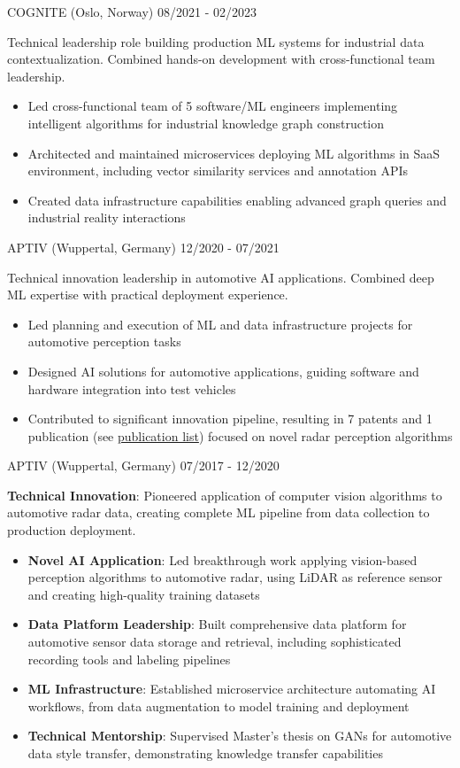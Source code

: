 \documentclass[singlesided,
               paper=a4,
               fontsize=10pt
              ]{my-resume}
\begin{document}
%
	{COGNITE (Oslo, Norway)}
	{08/2021 - 02/2023}
    {
        Technical leadership role building production ML systems for industrial data contextualization. Combined hands-on development with cross-functional team leadership.
        \begin{itemize}[leftmargin=2em]
            \item Led cross-functional team of 5 software/ML engineers implementing intelligent algorithms for industrial knowledge graph construction
            \item Architected and maintained microservices deploying ML algorithms in SaaS environment, including vector similarity services and annotation APIs
            \item Created data infrastructure capabilities enabling advanced graph queries and industrial reality interactions
        \end{itemize}
    }
%
    {APTIV (Wuppertal, Germany)}
    {12/2020 - 07/2021}
    {
        Technical innovation leadership in automotive AI applications. Combined deep ML expertise with practical deployment experience.
        \begin{itemize}[leftmargin=2em]
            \item Led planning and execution of ML and data infrastructure projects for automotive perception tasks
            \item Designed AI solutions for automotive applications, guiding software and hardware integration into test vehicles
            \item Contributed to significant innovation pipeline, resulting in 7 patents and 1 publication (see \href{https://scholar.google.com/citations?hl=de&user=MnU8ZxwAAAAJ}{publication list}) focused on novel radar perception algorithms
        \end{itemize}
    }
%
    {APTIV (Wuppertal, Germany)}
    {07/2017 - 12/2020}
    {
        \textbf{Technical Innovation}: Pioneered application of computer vision algorithms to automotive radar data, creating complete ML pipeline from data collection to production deployment.
        \begin{itemize}[leftmargin=2em]
            \item \textbf{Novel AI Application}: Led breakthrough work applying vision-based perception algorithms to automotive radar, using LiDAR as reference sensor and creating high-quality training datasets
            \item \textbf{Data Platform Leadership}: Built comprehensive data platform for automotive sensor data storage and retrieval, including sophisticated recording tools and labeling pipelines
            \item \textbf{ML Infrastructure}: Established microservice architecture automating AI workflows, from data augmentation to model training and deployment
            \item \textbf{Technical Mentorship}: Supervised Master's thesis on GANs for automotive data style transfer, demonstrating knowledge transfer capabilities
        \end{itemize}
    }
\end{document}
